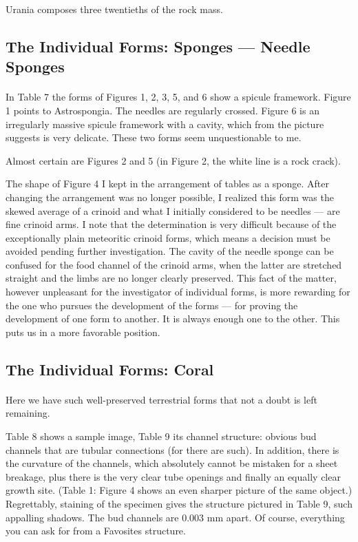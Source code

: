 \documentclass[a4paper, 11pt, oneside]{article}
\begin{document}
Urania composes three twentieths of the rock mass.
\clearpage
\subsection{The Individual Forms: Sponges — Needle Sponges}
\paragraph{}
In Table 7 the forms of Figures 1, 2, 3, 5, and 6 show a spicule framework. Figure 1 points to Astrospongia. The needles are regularly crossed. Figure 6 is an irregularly massive spicule framework with a cavity, which from the picture suggests is very delicate. These two forms seem unquestionable to me.

Almost certain are Figures 2 and 5 (in Figure 2, the white line is a rock crack).

The shape of Figure 4 I kept in the arrangement of tables as a sponge. After changing the arrangement was no longer possible, I realized this form was the skewed average of a crinoid and what I initially considered to be needles — are fine crinoid arms. I note that the determination is very difficult because of the exceptionally plain meteoritic crinoid forms, which means a decision must be avoided pending further investigation. The cavity of the needle sponge can be confused for the food channel of the crinoid arms, when the latter are stretched straight and the limbs are no longer clearly preserved. This fact of the matter, however unpleasant for the investigator of individual forms, is more rewarding for the one who pursues the development of the forms — for proving the development of one form to another. It is always enough one to the other. This puts us in a more favorable position.
\clearpage
\subsection{The Individual Forms: Coral}
\paragraph{}
Here we have such well-preserved terrestrial forms that not a doubt is left remaining.

Table 8 shows a sample image, Table 9 its channel structure: obvious bud channels that are tubular connections (for there are such). In addition, there is the curvature of the channels, which absolutely cannot be mistaken for a sheet breakage, plus there is the very clear tube openings and finally an equally clear growth site. (Table 1: Figure 4 shows an even sharper picture of the same object.) Regrettably, staining of the specimen gives the structure pictured in Table 9, such appalling shadows. The bud channels are 0.003 mm apart. Of course, everything you can ask for from a Favosites structure.
\end{document}

